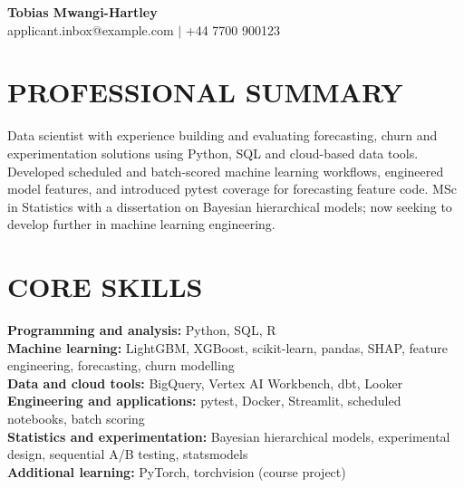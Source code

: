 \documentclass[11pt,a4paper]{article}
\begin{document}
\begin{center}
{\Huge\bfseries\color{primarycolor} Tobias Mwangi-Hartley}\\[0.35em]
{\small applicant.inbox@example.com $\vert$ +44 7700 900123}
\end{center}
\vspace{-0.4em}

\section*{PROFESSIONAL SUMMARY}
Data scientist with experience building and evaluating forecasting, churn and experimentation solutions using Python, SQL and cloud-based data tools. Developed scheduled and batch-scored machine learning workflows, engineered model features, and introduced pytest coverage for forecasting feature code. MSc in Statistics with a dissertation on Bayesian hierarchical models; now seeking to develop further in machine learning engineering.

\section*{CORE SKILLS}
\textbf{Programming and analysis:} Python, SQL, R\\
\textbf{Machine learning:} LightGBM, XGBoost, scikit-learn, pandas, SHAP, feature engineering, forecasting, churn modelling\\
\textbf{Data and cloud tools:} BigQuery, Vertex AI Workbench, dbt, Looker\\
\textbf{Engineering and applications:} pytest, Docker, Streamlit, scheduled notebooks, batch scoring\\
\textbf{Statistics and experimentation:} Bayesian hierarchical models, experimental design, sequential A/B testing, statsmodels\\
\textbf{Additional learning:} PyTorch, torchvision (course project)
\end{document}
